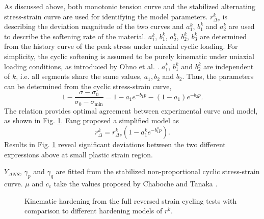 \documentclass[preprint,5p,twocolumn,11pt,sort&compress]{elsarticle}
\begin{document}
As discussed above, both monotonic tension curve and the stabilized alternating stress-strain curve are used for identifying the model parameters.
$r_{\Delta s}^k$ is describing the deviation magnitude of the two curves and $a_{1}^k$, $b_{1}^k$ and $a_{2}^k$ are used to describe the softening rate of the material.
$a_1^k$, $b_1^k$, $a_2^k$, $b_2^k$, $b_3^k$ are determined from the history curve of the peak stress under uniaxial cyclic loading. For simplicity, the cyclic softening is assumed to be purely kinematic under uniaxial loading conditions, as introduced by Ohno et al. \cite{Ohno1993375}.
$a_{1}^k$, $b_{1}^k$ and $b_{2}^k$ are independent of $k$, i.e. all segments share the same values, $a_1, b_2$ and $b_2$.
Thus, the parameters can be determined from the cyclic stress-strain curve,
\begin{equation}
1 - \frac{{\sigma  - {\sigma _0}}}{{{\sigma _0} - {\sigma _{\min }}}} = 1 - a_1{e^{ - b_1 p}} - \left( {1 - a_1} \right){e^{ - b_2 p}}.
\end{equation}
The relation provides optimal agreement between experimental curve and model, as shown in Fig.  \ref{Fig:Fitting300C_7041_Plot}. Fang \cite{fang2015cyclic} proposed a simplified model as
\begin{equation}
r_\Delta ^k = r_{\Delta s}^k\left( 1 - a_1^k{e^{ - b_1^kp}}\right).
\label{Equ:fangrdeltak}
\end{equation}
Results in Fig. \ref{Fig:Fitting300C_7041_Plot} reveal significant deviations between the two different expressions above at small plastic strain region.

$Y_{\Delta NS}$, $\gamma_p$ and $\gamma_q$ are fitted from the stabilized non-proportional cyclic stress-strain curve.
 $\mu$ and $c_c$ take the values proposed by Chaboche \cite{Chaboche1986149} and Tanaka \cite{tanaka1994nonproportionality}.


\begin{figure}[!htp]
\caption{Kinematic hardening from the full reversed strain cycling tests with comparison to different hardening models of $r^k$.}
\label{Fig:Fitting300C_7041_Plot}
\end{figure}
\end{document}
